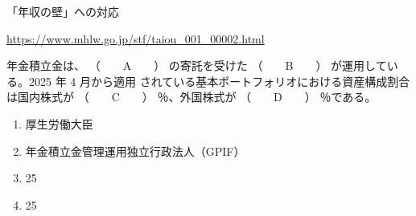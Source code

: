 \begin{explanationbox}
「年収の壁」への対応

  \url{https://www.mhlw.go.jp/stf/taiou_001_00002.html}
\end{explanationbox}

\begin{fillblank}[年金1 2025 問題1(5)ア]
  年金積立金は、 （　　A　　） の寄託を受けた （　　B　　） が運用している。2025 年 4 月から適用
されている基本ポートフォリオにおける資産構成割合は国内株式が （　　C　　） ％、外国株式が
（　　D　　） ％である。
\end{fillblank}

\begin{answerbox}
  \begin{enumerate}[A: ]
  \item 厚生労働大臣
  \item 年金積立金管理運用独立行政法人（GPIF）
  \item 25
  \item 25
\end{enumerate}
\end{answerbox}